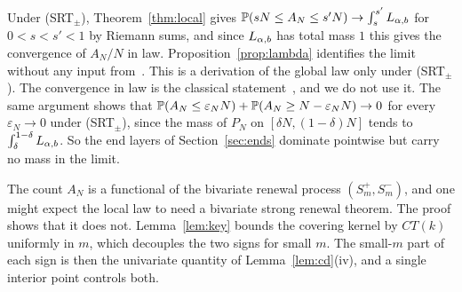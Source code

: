 \begin{remark}\label{rem:global}
Under (SRT$_\pm$), Theorem~\ref{thm:local} gives
$\mathbb{P}(sN\le A_N\le s'N)\to\int_s^{s'}L_{\alpha,b}$ for $0<s<s'<1$ by Riemann sums, and since $L_{\alpha,b}$
has total mass $1$ this gives the convergence of $A_N/N$ in law. Proposition~\ref{prop:lambda}
identifies the limit without any input from~\cite{lamperti1958}. This is a derivation of the global law
only under (SRT$_\pm$). The convergence in law is the classical
statement~\cite{lamperti1958}, and we do not use it. The same argument shows that
$\mathbb{P}(A_N\le\varepsilon_NN)+\mathbb{P}(A_N\ge N-\varepsilon_NN)\to0$ for every
$\varepsilon_N\to0$ under (SRT$_\pm$), since the mass of $P_N$ on $[\delta N,(1-\delta)N]$
tends to $\int_\delta^{1-\delta}L_{\alpha,b}$. So the end layers of Section~\ref{sec:ends}
dominate pointwise but carry no mass in the limit.
\end{remark}

\begin{remark}\label{rem:bivariate}
The count $A_N$ is a functional of the bivariate renewal process
$(S^\plus_m,S^\minus_m)$, and one might expect the local law to need a bivariate strong
renewal theorem. The proof shows that it does not. Lemma~\ref{lem:key} bounds the
covering kernel by $CT(k)$ uniformly in $m$, which decouples the two signs for small
$m$. The small-$m$ part of each sign is then the univariate quantity of
Lemma~\ref{lem:cd}(iv), and a single interior point controls both.
\end{remark}
